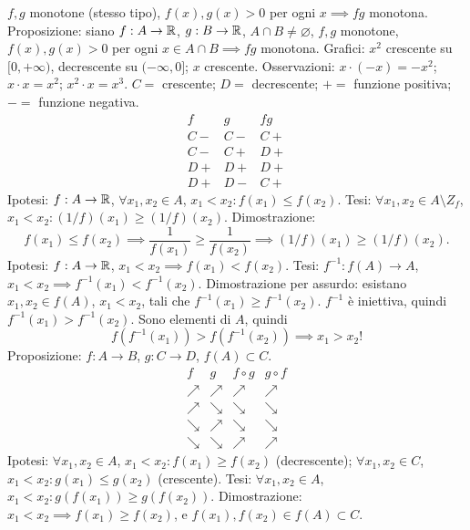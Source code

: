 $f,g$ monotone (stesso tipo), $f(x),g(x)>0$ per ogni $x\implies fg$ monotona.
Proposizione: siano $f:A\to\mathbb R$, $g:B\to\mathbb R$, $A\cap B\ne\varnothing$, $f,g$ monotone,
$f(x),g(x)>0$ per ogni $x\in A\cap B\implies fg$ monotona.
Grafici: $x^2$ crescente su $[0,+\infty)$, decrescente su $(-\infty,0]$; $x$ crescente.
Osservazioni: $x\cdot(-x)=-x^2$; $x\cdot x=x^2$; $x^2\cdot x=x^3$.
$C=$ crescente; $D=$ decrescente; $+=$ funzione positiva; $-=$ funzione negativa.
\[\begin{array}{c|c|c}f&g&fg\\\hline C-&C-&C+\\C-&C+&D+\\D+&D+&D+\\D+&D-&C+\end{array}\]
Ipotesi: $f:A\to\mathbb R$, $\forall x_1,x_2\in A$, $x_1<x_2:f(x_1)\le f(x_2)$.
Tesi: $\forall x_1,x_2\in A\setminus Z_f$, $x_1<x_2:(1/f)(x_1)\ge(1/f)(x_2)$.
Dimostrazione:
\[f(x_1)\le f(x_2)\implies\frac1{f(x_1)}\ge\frac1{f(x_2)}\implies(1/f)(x_1)\ge(1/f)(x_2).\]
Ipotesi: $f:A\to\mathbb R$, $x_1<x_2\implies f(x_1)<f(x_2)$.
Tesi: $f^{-1}:f(A)\to A$, $x_1<x_2\implies f^{-1}(x_1)<f^{-1}(x_2)$.
Dimostrazione per assurdo: esistano $x_1,x_2\in f(A)$, $x_1<x_2$, tali che
$f^{-1}(x_1)\ge f^{-1}(x_2)$. $f^{-1}$ è iniettiva, quindi
$f^{-1}(x_1)>f^{-1}(x_2)$. Sono elementi di $A$, quindi
\[f(f^{-1}(x_1))>f(f^{-1}(x_2))\implies\boxed{x_1>x_2!}\]
Proposizione: $f:A\to B$, $g:C\to D$, $f(A)\subset C$.
\[\begin{array}{c|c|c|c}f&g&f\circ g&g\circ f\\\hline\nearrow&\nearrow&\nearrow&\nearrow\\\nearrow&\searrow&\searrow&\searrow\\\searrow&\nearrow&\searrow&\searrow\\\searrow&\searrow&\nearrow&\nearrow\end{array}\]
Ipotesi: $\forall x_1,x_2\in A$, $x_1<x_2:f(x_1)\ge f(x_2)$ (decrescente);
$\forall x_1,x_2\in C$, $x_1<x_2:g(x_1)\le g(x_2)$ (crescente).
Tesi: $\forall x_1,x_2\in A$, $x_1<x_2:g(f(x_1))\ge g(f(x_2))$.
Dimostrazione: $x_1<x_2\implies f(x_1)\ge f(x_2)$, e $f(x_1),f(x_2)\in f(A)\subset C$.
